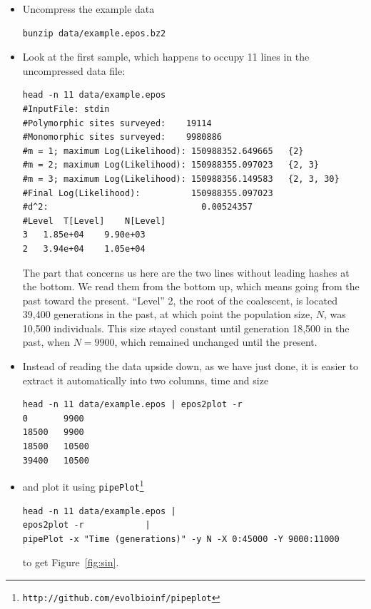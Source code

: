 \documentclass[a4paper]{article}
\newcommand{\ty}{\texttt}
\begin{document}
\begin{itemize}
\item Uncompress the example data
\begin{verbatim}
bunzip data/example.epos.bz2
\end{verbatim}
\item Look at the first sample, which happens to occupy 11 lines in
  the uncompressed data file:
\begin{verbatim}
head -n 11 data/example.epos 
#InputFile:	stdin
#Polymorphic sites surveyed:	19114
#Monomorphic sites surveyed:	9980886
#m = 1; maximum Log(Likelihood): 150988352.649665	{2}
#m = 2; maximum Log(Likelihood): 150988355.097023	{2, 3}
#m = 3; maximum Log(Likelihood): 150988356.149583	{2, 3, 30}
#Final Log(Likelihood):          150988355.097023
#d^2:                              0.00524357
#Level	T[Level]	N[Level]
3	1.85e+04	9.90e+03
2	3.94e+04	1.05e+04
\end{verbatim}
The part that concerns us here are the two lines without
leading hashes at the bottom. We read them from the bottom up, which means going
from the past toward the present. ``Level'' 2, the root of the
coalescent, is located 39,400 generations in the past, at
which point the population size, $N$, was 10,500 individuals. This
size stayed constant until generation 18,500 in the past,
when $N=9900$, which remained unchanged until the present.

\item Instead of reading the data upside down, as we have just done,
  it is easier to extract it automatically into two columns, time and size
\begin{verbatim}
head -n 11 data/example.epos | epos2plot -r
0       9900
18500   9900
18500   10500
39400   10500
\end{verbatim}
\item and plot it using \ty{pipePlot}\footnote{\ty{http://github.com/evolbioinf/pipeplot}}
\begin{verbatim}
head -n 11 data/example.epos | 
epos2plot -r            | 
pipePlot -x "Time (generations)" -y N -X 0:45000 -Y 9000:11000
\end{verbatim}
to get Figure~\ref{fig:sin}.


\end{itemize}
\end{document}
